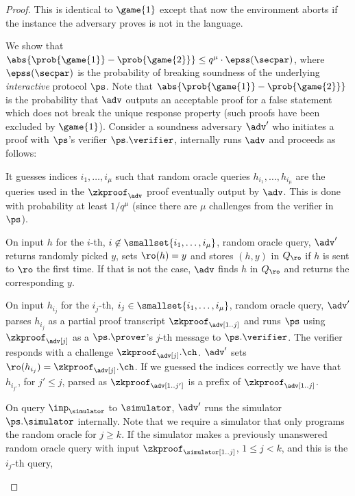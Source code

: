 \begin{proof}
	 This is identical to $\game{1}$ except that now the environment
	aborts if the instance the adversary proves is not in the language.
	
	We show that
	$\abs{\prob{\game{1}} - \prob{\game{2}}} \leq q^{\mu} \cdot \epss(\secpar)$,
	where $\epss(\secpar)$ is the probability of breaking soundness of the underlying
	\emph{interactive} protocol $\ps$. Note that
	$\abs{\prob{\game{1}} - \prob{\game{2}}}$ is the probability that $\adv$
	outputs an acceptable proof for a false statement which does not break the
	unique response property (such proofs have been excluded by
	$\game{1}$). Consider a soundness adversary $\adv'$ who initiates a proof with
	$\ps$'s verifier $\ps.\verifier$, internally runs $\adv$ and proceeds as
	follows:
	\begin{compactitem}
		\item It guesses indices $i_1, \ldots, i_\mu$ such that random oracle queries
		$h_{i_1}, \ldots, h_{i_\mu}$ are the queries used in the $\zkproof_\adv$
		proof eventually output by $\adv$. This is done with probability at least
		$1/q^\mu$ (since there are $\mu$ challenges from the verifier in
		$\ps$).
		\item On input $h$ for the $i$-th,
		$i \not\in \smallset{{i_1}, \ldots, {i_\mu}}$, random oracle query, $\adv'$
		returns randomly picked $y$, sets $\ro(h) = y $ and stores $(h, y)$ in
		$Q_\ro$ if $h$ is sent to $\ro$ the first time. If that is not the case,
		$\adv$ finds $h$ in $Q_\ro$ and returns the corresponding $y$.
		\item On input $h_{i_j}$ for the $i_j$-th,
		$i_j \in \smallset{{i_1}, \ldots, {i_\mu}}$, random oracle query, $\adv'$
		parses $h_{i_j}$ as a partial proof transcript $\zkproof_\adv[1..j]$ and
		runs $\ps$ using $\zkproof_\adv[j]$ as a $\ps.\prover$'s $j$-th message to
		$\ps.\verifier$. The verifier responds with a challenge
		$\zkproof_\adv[j].\ch$. $\adv'$ sets $\ro(h_{i_j}) =
		\zkproof_\adv[j].\ch$. If we guessed the indices correctly we have that
		$h_{i_{j'}}$, for $j' \leq j$, parsed as $\zkproof_\adv[1..j']$ is a prefix
		of $\zkproof_\adv[1..j]$.
		\item On query $\inp_\simulator$ to $\simulator$, $\adv'$ runs the simulator
		$\ps.\simulator$ internally. Note that we require a simulator that only
		programs the random oracle for $j \geq k$.  If the simulator makes a
		previously unanswered random oracle query with input
		$\zkproof_\simulator[1..j]$, $1 \leq j < k$, and this is the $i_j$-th query,

\end{compactitem}
\end{proof}
